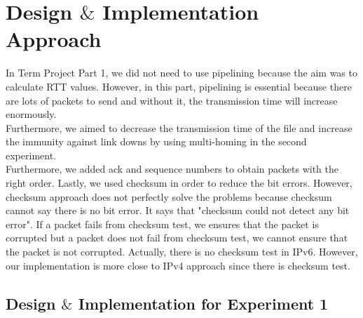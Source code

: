 \documentclass[conference]{IEEEtran}
\begin{document}
\section{Design $\&$ Implementation Approach}
In Term Project Part 1, we did not need to use pipelining because the aim was to calculate RTT values. However, in this part, pipelining is essential because there are lots of packets to send and without it, the transmission time will increase enormously. \\

Furthermore, we aimed to decrease the transmission time of the file and increase the immunity against link downs by using multi-homing in the second experiment. \\

Furthermore, we added ack and sequence numbers to obtain packets with the right order. Lastly, we used checksum in order to reduce the bit errors. However, checksum approach does not perfectly solve the problems because checksum cannot say there is no bit error. It says that "checksum could not detect any bit error". If a packet fails from checksum test, we ensures that the packet is corrupted but a packet does not fail from checksum test, we cannot ensure that the packet is not corrupted. Actually, there is no checksum test in IPv6. However, our implementation is more close to IPv4 approach since there is checksum test. \\

\subsection{Design $\&$ Implementation for Experiment 1}

\begin{center}
\end{center}
\end{document}
